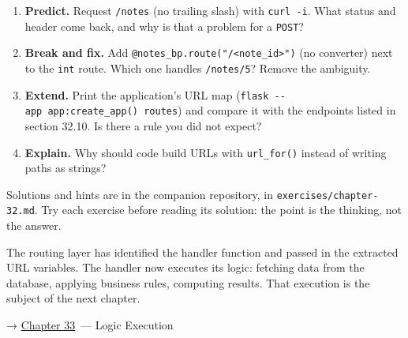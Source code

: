 \begin{enumerate}
\def\labelenumi{\arabic{enumi}.}
\tightlist
\item
  \textbf{Predict.} Request \texttt{/notes} (no trailing slash) with \texttt{curl\ -i}. What status and header come back, and why is that a problem for a \texttt{POST}?
\item
  \textbf{Break and fix.} Add \texttt{@notes\_}\allowbreak{}\texttt{bp.}\allowbreak{}\texttt{route("/}\allowbreak{}\texttt{\textless{}note\_}\allowbreak{}\texttt{id\textgreater{}")} (no converter) next to the \texttt{int} route. Which one handles \texttt{/notes/5}? Remove the ambiguity.
\item
  \textbf{Extend.} Print the application's URL map (\texttt{flask\ -}\allowbreak{}\texttt{-}\allowbreak{}\texttt{app\ \textquotesingle{}app:}\allowbreak{}\texttt{create\_}\allowbreak{}\texttt{app()\textquotesingle{}\ routes}) and compare it with the endpoints listed in section 32.10. Is there a rule you did not expect?
\item
  \textbf{Explain.} Why should code build URLs with \texttt{url\_for()} instead of writing paths as strings?
\end{enumerate}

\noindent{}Solutions and hints are in the companion repository, in \texttt{exercises/}\allowbreak{}\texttt{chapter-32.md}. Try each exercise before reading its solution: the point is the thinking, not the answer.

\label{32-routing:whats-next}

The routing layer has identified the handler function and passed in the extracted URL variables. The handler now executes its logic: fetching data from the database, applying business rules, computing results. That execution is the subject of the next chapter.

\noindent{}→ \hyperref[ch:33-logic-execution]{Chapter 33}~--- Logic Execution
